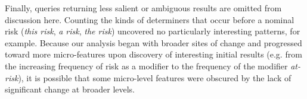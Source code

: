 Finally, queries returning less salient or ambiguous results are omitted from discussion here. Counting the kinds of determiners that occur before a nominal risk (\emph{this risk}, \emph{a risk}, \emph{the risk}) uncovered no particularly interesting patterns, for example. Because our analysis began with broader sites of change and progressed toward more micro-features upon discovery of interesting initial results (e.g. from the increasing frequency of risk as a modifier to the frequency of the modifier \emph{at-risk}), it is possible that some micro-level features were obscured by the lack of significant change at broader levels.








